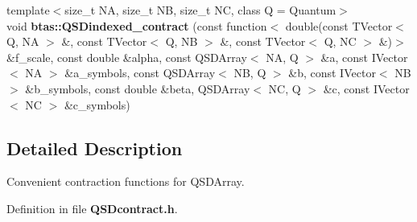 \begin{DoxyCompactItemize}
\item 
{\footnotesize template$<$size\-\_\-t N\-A, size\-\_\-t N\-B, size\-\_\-t N\-C, class Q  = Quantum$>$ }\\void {\bf btas\-::\-Q\-S\-Dindexed\-\_\-contract} (const function$<$ double(const T\-Vector$<$ Q, N\-A $>$ \&, const T\-Vector$<$ Q, N\-B $>$ \&, const T\-Vector$<$ Q, N\-C $>$ \&)$>$ \&f\-\_\-scale, const double \&alpha, const Q\-S\-D\-Array$<$ N\-A, Q $>$ \&a, const I\-Vector$<$ N\-A $>$ \&a\-\_\-symbols, const Q\-S\-D\-Array$<$ N\-B, Q $>$ \&b, const I\-Vector$<$ N\-B $>$ \&b\-\_\-symbols, const double \&beta, Q\-S\-D\-Array$<$ N\-C, Q $>$ \&c, const I\-Vector$<$ N\-C $>$ \&c\-\_\-symbols)
\end{DoxyCompactItemize}


\subsection{Detailed Description}
Convenient contraction functions for Q\-S\-D\-Array. 

Definition in file {\bf Q\-S\-Dcontract.\-h}.

